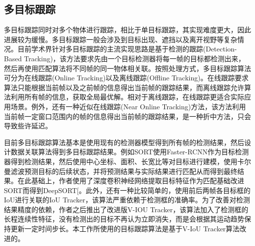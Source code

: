 \subsection{多目标跟踪}
\label{mot}
多目标跟踪同时对多个物体进行跟踪，相比于单目标跟踪，其实现难度更大，因此进展较为缓慢。多目标跟踪一般会涉及到目标出现、遮挡以及离开视野等复杂情况。目前学术界针对多目标跟踪的主流实现思路是基于检测的跟踪(Detection-Based Tracking)，该方法要求先由一个目标检测器将每一帧的目标都检测出来，然后再使用匹配算法将不同帧的同一物体相关联。按照处理方式，多目标跟踪算法可分为在线跟踪(Online Tracking)以及离线跟踪(Offline Tracking)。在线跟踪要求算法只能根据当前帧以及之前帧的信息得出当前帧的跟踪结果，而离线跟踪允许算法利用所有帧的信息，获取全局最优解。相对于离线跟踪，在线跟踪更适合实际应用场景。例外，还有一种近似在线跟踪(Near Online Tracking)方法，该方法利用当前帧一定窗口范围内的帧的信息得出当前帧的跟踪结果，是一种折中方法，只会导致些许延迟。

目前多目标跟踪算法基本是使用现有的检测器模型得到所有帧的检测结果，然后设计数据关联算法得到多目标跟踪结果。例如SORT\cite{bewley2016simple}使用Faster-RCNN作为目标检测器得到检测结果，然后使用中心坐标、面积、长宽比等对目标进行建模，使用卡尔曼滤波预测目标的后续状态，并将预测结果与实际结果进行匹配从而得到最终结果。在此基础上，作者使用了深度卷积神经网络提取目标特征作为匹配基础改进SORT而得到DeepSORT[\cite{wojke2017simple}。此外，还有一种比较简单的，使用前后两帧各目标框的IoU进行关联的IoU Tracker\cite{bochinski2017high}，该算法严重依赖于检测框的准确率。为了改善对检测结果精度的依赖，作者之后推出了改进版V-IOU Tracker\cite{bochinski2018extending}，该算法加入了检测框的长程连续性特征，没有检测出的目标不再认为立即消失，而是会根据其运动趋势保持更新一定时间步长。本工作所使用的目标跟踪算法是基于V-IoU Tracker算法改进的。

